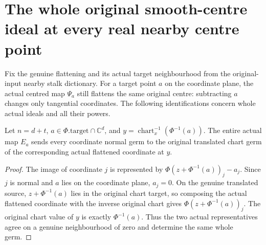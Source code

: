 \section{The whole original smooth-centre ideal at every real nearby centre point}

Fix the genuine flattening and its actual target neighbourhood from the
original-input nearby stalk dictionary. For a target point $a$ on the
coordinate plane, the actual centred map $\Psi_a$ still flattens the
same original centre: subtracting $a$ changes only tangential
coordinates. The following identifications concern whole actual ideals
and all their powers.

\begin{lemma}
\label{hir:nearby-centre-actual-normal-coordinate-germs}
\leanok
Let $n=d+t$, $a\in\Phi.\mathrm{target}\cap\mathbb C^d$, and
$y=\operatorname{chart}_x^{-1}(\Phi^{-1}(a))$. The entire actual map
$E_a$ sends every coordinate normal germ to the original translated
chart germ of the corresponding actual flattened coordinate at $y$.
\end{lemma}
\begin{proof}
The image of coordinate $j$ is represented by
$\Phi(z+\Phi^{-1}(a))_j-a_j$. Since $j$ is normal and $a$ lies on
the coordinate plane, $a_j=0$. On the genuine translated source,
$z+\Phi^{-1}(a)$ lies in the original chart target, so composing the
actual flattened coordinate with the inverse original chart gives
$\Phi(z+\Phi^{-1}(a))_j$. The original chart value of $y$ is exactly
$\Phi^{-1}(a)$. Thus the two actual representatives agree on a genuine
neighbourhood of zero and determine the same whole germ.
\end{proof}

